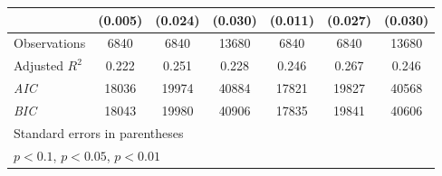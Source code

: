 {\begin{tabular}{l*{6}{c}}
                    &     (0.005)         &     (0.024)         &     (0.030)         &     (0.011)         &     (0.027)         &     (0.030)         \\
\hline
Observations        &        6840         &        6840         &       13680         &        6840         &        6840         &       13680         \\
Adjusted \(R^{2}\)  &       0.222         &       0.251         &       0.228         &       0.246         &       0.267         &       0.246         \\
\textit{AIC}        &       18036         &       19974         &       40884         &       17821         &       19827         &       40568         \\
\textit{BIC}        &       18043         &       19980         &       40906         &       17835         &       19841         &       40606         \\
\hline\hline
\multicolumn{7}{l}{\footnotesize Standard errors in parentheses}\\
\multicolumn{7}{l}{\footnotesize \sym{*} \(p<0.1\), \sym{**} \(p<0.05\), \sym{***} \(p<0.01\)}\\
\end{tabular}
}
